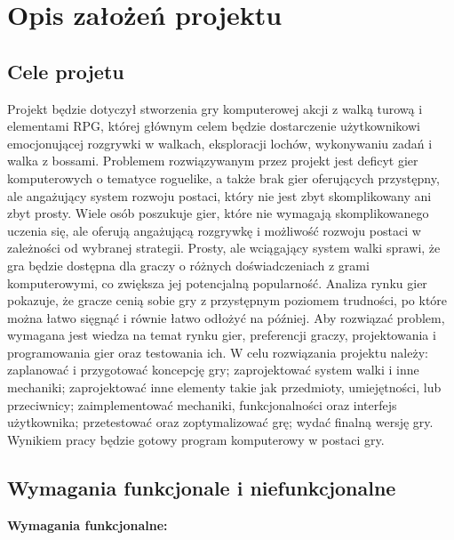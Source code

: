 \chapter{Opis założeń projektu}
\section{Cele projetu}

Projekt będzie dotyczył stworzenia gry komputerowej akcji z walką turową i elementami RPG, której głównym celem będzie dostarczenie użytkownikowi emocjonującej rozgrywki w walkach, eksploracji lochów, wykonywaniu zadań i walka z bossami. 
Problemem rozwiązywanym przez projekt jest deficyt gier komputerowych o tematyce roguelike, a także brak gier oferujących przystępny, ale angażujący system rozwoju postaci, który nie jest zbyt skomplikowany ani zbyt prosty. 
Wiele osób poszukuje gier, które nie wymagają skomplikowanego uczenia się, ale oferują angażującą rozgrywkę i możliwość rozwoju postaci w zależności od wybranej strategii. 
Prosty, ale wciągający system walki sprawi, że gra będzie dostępna dla graczy o różnych doświadczeniach z grami komputerowymi, co zwiększa jej potencjalną popularność. 
Analiza rynku gier pokazuje, że gracze cenią sobie gry z przystępnym poziomem trudności, po które można łatwo sięgnąć i równie łatwo odłożyć na później. 
Aby rozwiązać problem, wymagana jest wiedza na temat rynku gier, preferencji graczy, projektowania i programowania gier oraz testowania ich. 
W celu rozwiązania projektu należy: zaplanować i przygotować koncepcję gry; zaprojektować system walki i inne mechaniki; zaprojektować inne elementy takie jak przedmioty, umiejętności, lub przeciwnicy; zaimplementować mechaniki, funkcjonalności oraz 
interfejs użytkownika; przetestować oraz zoptymalizować grę; wydać finalną wersję gry. Wynikiem pracy będzie gotowy program komputerowy w postaci gry.

\section{Wymagania funkcjonale i niefunkcjonalne}
 
\noindent \textbf{Wymagania funkcjonalne:}

